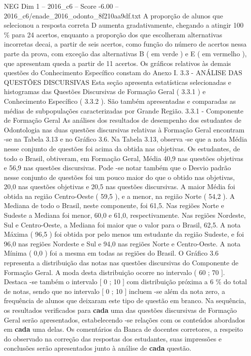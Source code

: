 \begin{textsample}{NEG Dim 1 – 2016\_c6 – Score -6.00 – 2016\_c6/enade\_2016\_odonto\_8f210aa9df.txt}
A proporção de alunos que selecionou a resposta correta D aumenta gradativamente, chegando a atingir 100 \% para 24 acertos, enquanto a proporção dos que escolheram alternativas incorretas decai, a partir de seis acertos, como função do número de acertos nessa parte da prova, com exceção das alternativas B ( em verde ) e E ( em vermelho ), que apresentam queda a partir de 11 acertos.
Os gráficos relativos às demais questões do Conhecimento Específico constam do Anexo I. 3.3 - ANÁLISE DAS QUESTÕES DISCURSIVAS Esta seção apresenta estatísticas selecionadas e histogramas das Questões Discursivas de Formação Geral ( 3.3.1 ) e Conhecimento Específico ( 3.3.2 ).
São também apresentadas e comparadas as médias de subpopulações caracterizadas por Grande Região. 3.3.1 - Componente de Formação Geral As análises dos resultados de desempenho dos estudantes de Odontologia nas duas questões discursivas relativas à Formação Geral encontram -se na Tabela 3.13 e no Gráfico 3.6.
Na Tabela 3.13, observa -se que a nota Média nesse conjunto de questões foi acima da obtida nas objetivas.
Os estudantes, de todo o Brasil, obtiveram, em Formação Geral, Média 40,9 nas questões objetivas e 56,9 nas questões discursivas.
Pode -se notar também que o Desvio padrão nesse conjunto de questões foi um pouco maior do que o obtido nas objetivas, 20,0 nas questões objetivas e 20,5 nas questões discursivas.
A maior Média foi obtida na região Centro-Oeste ( 59,5 ), e a menor, na região Norte ( 54,2 ).
A Mediana de todo o Brasil, neste componente, foi 61,5.
Nas regiões Norte e Sudeste a Mediana foi menor, 60,0 e 61,0, respectivamente.
Nas regiões Nordeste, Sul e Centro-Oeste, a Mediana foi maior que o valor para o Brasil, 62,5.
A nota Máxima ( 96,5 ) foi obtida por pelo menos um estudante da região Sudeste, e foi 96,0 nas regiões Nordeste e Sul e 94,0 nas regiões Norte e Centro-Oeste.
A nota Mínima ( 0,0 ) foi a mesma em todas as regiões do Brasil.
O Gráfico 3.6 representa a distribuição das notas nas questões discursivas do Componente de Formação Geral.
A moda desta distribuição ocorre no intervalo ( 60 ; 70 ].
Destaca -se também o intervalo [ 0 ; 10 ] com distribuição próxima a 6 \% do total de notas, sendo que no intervalo [ 0 ; 10 ] incluem -se além da nota zero, a frequência de alunos que deixaram este tipo de questão em branco.
Na sequência, os resultados verificados para \textbf{cada} uma das questões discursivas de Formação Geral serão apresentados, estabelecendo -se relações com os conteúdos abordados em \textbf{cada} uma delas.
Os comentários da Banca de docentes corretores, a respeito do observado na correção das respostas dos estudantes, suas impressões e conclusões serão apresentados junto à análise de \textbf{cada} questão.

\end{textsample}
